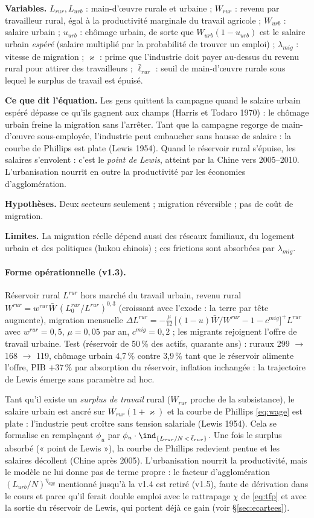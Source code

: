 \documentclass[11pt,a4paper]{article}
\newcommand{\og}{« }
\newcommand{\fg}{ »}
\newcommand{\variables}{\par\noindent\textbf{Variables.} }
\newcommand{\sens}{\par\noindent\textbf{Ce que dit l'équation.} }
\newcommand{\hyp}{\par\noindent\textbf{Hypothèses.} }
\newcommand{\limites}{\par\noindent\textbf{Limites.} }
\begin{document}
\begin{lecture}
\variables $L_{rur}, L_{urb}$ : main-d'œuvre rurale et urbaine ; $W_{rur}$ : revenu par travailleur rural, égal à la productivité marginale du travail agricole ; $W_{urb}$ : salaire urbain ; $u_{urb}$ : chômage urbain, de sorte que $W_{urb}(1-u_{urb})$ est le salaire urbain \emph{espéré} (salaire multiplié par la probabilité de trouver un emploi) ; $\lambda_{mig}$ : vitesse de migration ; $\varkappa$ : prime que l'industrie doit payer au-dessus du revenu rural pour attirer des travailleurs ; $\bar\ell_{rur}$ : seuil de main-d'œuvre rurale sous lequel le surplus de travail est épuisé.
\sens Les gens quittent la campagne quand le salaire urbain espéré dépasse ce qu'ils gagnent aux champs (Harris et Todaro 1970) : le chômage urbain freine la migration sans l'arrêter. Tant que la campagne regorge de main-d'œuvre sous-employée, l'industrie peut embaucher sans hausse de salaire : la courbe de Phillips est plate (Lewis 1954). Quand le réservoir rural s'épuise, les salaires s'envolent : c'est le \emph{point de Lewis}, atteint par la Chine vers 2005--2010. L'urbanisation nourrit en outre la productivité par les économies d'agglomération.
\hyp Deux secteurs seulement ; migration réversible ; pas de coût de migration.
\limites La migration réelle dépend aussi des réseaux familiaux, du logement urbain et des politiques (hukou chinois) ; ces frictions sont absorbées par $\lambda_{mig}$.
\paragraph{Forme opérationnelle (v1.3).} Réservoir rural $L^{rur}$ hors marché du travail urbain, revenu rural $W^{rur}=w^{rur}\bar W\,(L^{rur}_0/L^{rur})^{0{,}3}$ (croissant avec l'exode : la terre par tête augmente), migration mensuelle $\Delta L^{rur} = -\frac{\mu}{12}\,\big[(1-u)\bar W/W^{rur} - 1 - c^{mig}\big]^+ L^{rur}$ avec $w^{rur}=0{,}5$, $\mu=0{,}05$ par an, $c^{mig}=0{,}2$ ; les migrants rejoignent l'offre de travail urbaine. Test (réservoir de 50\,\% des actifs, quarante ans) : ruraux 299 $\to$ 168 $\to$ 119, chômage urbain 4,7\,\% contre 3,9\,\% tant que le réservoir alimente l'offre, PIB $+37\,\%$ par absorption du réservoir, inflation inchangée : la trajectoire de Lewis émerge sans paramètre ad hoc.
\end{lecture}
Tant qu'il existe un \emph{surplus de travail} rural ($W_{rur}$ proche de la subsistance), le salaire urbain est ancré sur $W_{rur}(1+\varkappa)$ et la courbe de Phillips \eqref{eq:wage} est plate : l'industrie peut croître sans tension salariale (Lewis 1954). Cela se formalise en remplaçant $\phi_u$ par $\phi_u\cdot\ind_{\{L_{rur}/N\,<\,\bar\ell_{rur}\}}$. Une fois le surplus absorbé (\og point de Lewis\fg), la courbe de Phillips redevient pentue et les salaires décollent (Chine après 2005). L'urbanisation nourrit la productivité, mais le modèle ne lui donne pas de terme propre : le facteur d'agglomération $(L_{urb}/N)^{\eta_{agg}}$ mentionné jusqu'à la v1.4 est retiré (v1.5), faute de dérivation dans le cours et parce qu'il ferait double emploi avec le rattrapage $\chi$ de \eqref{eq:tfp} et avec la sortie du réservoir de Lewis, qui portent déjà ce gain (voir \S\ref{sec:ecartees}).
\end{document}
